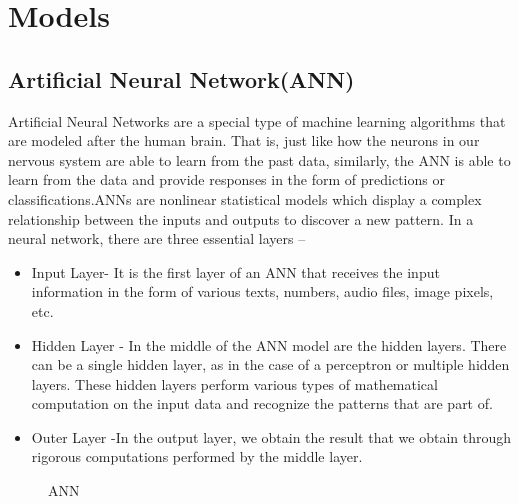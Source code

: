 \chapter{Models}\label{final}

\section{Artificial Neural Network(ANN)}
Artificial Neural Networks are a special type of machine learning algorithms that are modeled after the human brain. That is, just like how the neurons in our nervous system are able to learn from the past data, similarly, the ANN is able to learn from the data and provide responses in the form of predictions or classifications.ANNs are nonlinear statistical models which display a complex relationship between the inputs and outputs to discover a new pattern.\cite{models}
 In a neural network, there are three essential layers –
 \begin{itemize}
     \item  Input Layer- It is the first layer of an ANN that receives the input information in the form of various texts, numbers, audio files, image pixels, etc.
     \item Hidden Layer - In the middle of the ANN model are the hidden layers. There can be a single hidden layer, as in the case of a perceptron or multiple hidden layers. These hidden layers perform various types of mathematical computation on the input data and recognize the patterns that are part of.
     \item Outer Layer -In the output layer, we obtain the result that we obtain through rigorous computations performed by the middle layer.
 \end{itemize}
 
 \begin{figure}
%
  \caption{ANN}
  \label{fig:key}
\end{figure}

